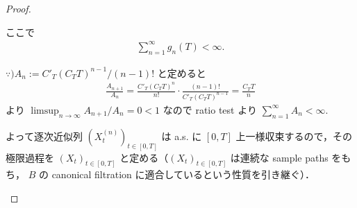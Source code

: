 \documentclass{jsarticle}
\begin{document}
\begin{proof}
\begin{enumerate}[label=(\roman*)]



        ここで
        \begin{align}
            \sum_{n=1}^{\infty}g_n(T)<\infty.
        \end{align}

        \begin{screen}
            $\because) A_n:=C'_T(C_T T)^{n-1}/(n-1)!$ と定めると
            \begin{align}
                \frac{A_{n+1}}{A_n}
                = \frac{C'_T(C_T T)^{n}}{n!}\cdot \frac{(n-1)!}{C'_T(C_T T)^{n-1}}
                = \frac{C_T T}{n}
            \end{align}
            より $\limsup_{n\to\infty}A_{n+1}/A_n=0<1$ なので ratio test より $\sum_{n=1}^{\infty}A_n<\infty.$
        \end{screen}
        よって逐次近似列 $(X_t^{(n)})_{t\in[0, T]}$ は a.s. に $[0, T]$ 上一様収束するので，その極限過程を $(X_t)_{t\in[0, T]}$ と定める（$(X_t)_{t\in[0, T]}$ は連続な sample paths をもち， $B$ の canonical filtration に適合しているという性質を引き継ぐ）．
    \end{enumerate}
\end{proof}
\end{document}
